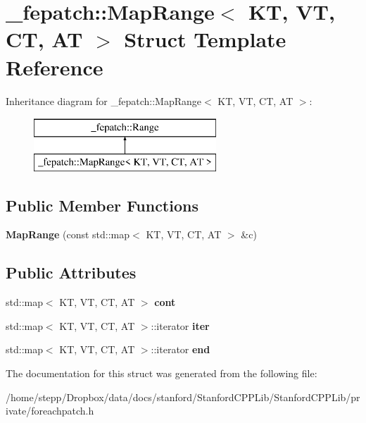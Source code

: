 \hypertarget{struct__fepatch_1_1MapRange}{}\section{\+\_\+fepatch\+:\+:Map\+Range$<$ KT, VT, CT, AT $>$ Struct Template Reference}
\label{struct__fepatch_1_1MapRange}
Inheritance diagram for \+\_\+fepatch\+:\+:Map\+Range$<$ KT, VT, CT, AT $>$\+:\begin{figure}[H]
\begin{center}
\leavevmode
\includegraphics[height=2.000000cm]{struct__fepatch_1_1MapRange}
\end{center}
\end{figure}
\subsection*{Public Member Functions}
\begin{DoxyCompactItemize}
\item 
\mbox{\label{struct__fepatch_1_1MapRange_a6e38f328b13fd5244b8a9915ab499338}} 
{\bfseries Map\+Range} (const std\+::map$<$ KT, VT, CT, AT $>$ \&c)
\end{DoxyCompactItemize}
\subsection*{Public Attributes}
\begin{DoxyCompactItemize}
\item 
\mbox{\label{struct__fepatch_1_1MapRange_a149f30d36a1ad057b49af1dfb81a68a0}} 
std\+::map$<$ KT, VT, CT, AT $>$ {\bfseries cont}
\item 
\mbox{\label{struct__fepatch_1_1MapRange_a0e1009fd2f601a8cb0c7f0a492a36dac}} 
std\+::map$<$ KT, VT, CT, AT $>$\+::iterator {\bfseries iter}
\item 
\mbox{\label{struct__fepatch_1_1MapRange_a9a65e81fa1d3c35cf09183b70de31ece}} 
std\+::map$<$ KT, VT, CT, AT $>$\+::iterator {\bfseries end}
\end{DoxyCompactItemize}


The documentation for this struct was generated from the following file\+:\begin{DoxyCompactItemize}
\item 
/home/stepp/\+Dropbox/data/docs/stanford/\+Stanford\+C\+P\+P\+Lib/\+Stanford\+C\+P\+P\+Lib/private/foreachpatch.\+h\end{DoxyCompactItemize}
